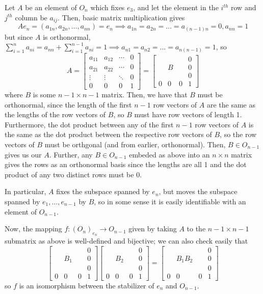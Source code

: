 \documentclass[12pt,letterpaper]{article}
\theoremstyle{definition}
\begin{document}
Let $A$ be an element of $O_{n}$ which fixes $e_{3}$, and let the element in the $i^{th}$ row and $j^{th}$ column be $a_{ij}$. Then, basic matrix multiplication gives
\[
  Ae_{n} = (a_{1n},a_{2n}, \dots, a_{nn}) = e_{n} \implies a_{1n} = a_{2n} = \dots = a_{(n-1)n} = 0, a_{nn} = 1
\]
but since $A$ is orthonormal, $\sum_{i=1}^{n}a_{ni} = a_{nn} + \sum_{i=1}^{n-1}a_{ni} = 1 \implies a_{n1} = a_{n2} = \dots = a_{n(n-1)} = 1$, so
\[
  A = \begin{bmatrix} a_{11} & a_{12} & \cdots & 0 \\  a_{21} & a_{22} & \cdots & 0 \\ \vdots & \vdots & \ddots & 0 \\ 0 & 0 & 0 & 1 \end{bmatrix} = \begin{bmatrix} & & & 0 \\ & B & & 0 \\ & & & 0 \\ 0 & 0 & 0 & 1 \end{bmatrix}
\]
where $B$ is some $n - 1 \times n - 1$ matrix. Then, we have that $B$ must be orthonormal, since the length of the first $n-1$ row vectors of $A$ are the same as the lengths of the row vectors of $B$, so $B$ must have row vectors of length 1. Furthermore, the dot product between any of the first $n - 1$ row vectors of $A$ is the same as the dot product between the respective row vectors of $B$, so the row vectors of $B$ must be orthgonal (and from earlier, orthonormal). Then, $B \in O_{n-1}$ gives us our $A$. Further, any $B \in O_{n - 1}$ embeded as above into an $n \times n$ matrix gives the rows as an orthonormal basis since the lengths are all 1 and the dot product of any two distinct rows must be 0.

In particular, $A$ fixes the subspace spanned by $e_{n}$, but moves the subspace spanned by $e_{1}, \dots, e_{n-1}$ by $B$, so in some sense it is easily identifiable with an element of $O_{n-1}$.

Now, the mapping $f: (O_{n})_{e_{n}} \rightarrow O_{n-1}$ given by taking $A$ to the $n-1 \times n-1$ submatrix as above is well-defined and bijective; we can also check easily that
\[
  \begin{bmatrix} & & & 0 \\ & B_{1} & & 0 \\ & & & 0 \\ 0 & 0 & 0 & 1 \end{bmatrix} \begin{bmatrix} & & & 0 \\ & B_{2} & & 0 \\ & & & 0 \\ 0 & 0 & 0 & 1 \end{bmatrix} = \begin{bmatrix} & & & 0 \\ & B_{1}B_{2} & & 0 \\ & & & 0 \\ 0 & 0 & 0 & 1 \end{bmatrix}
\]
so $f$ is an isomorphism between the stabilizer of $e_{n}$ and $O_{n-1}$.
\end{document}
